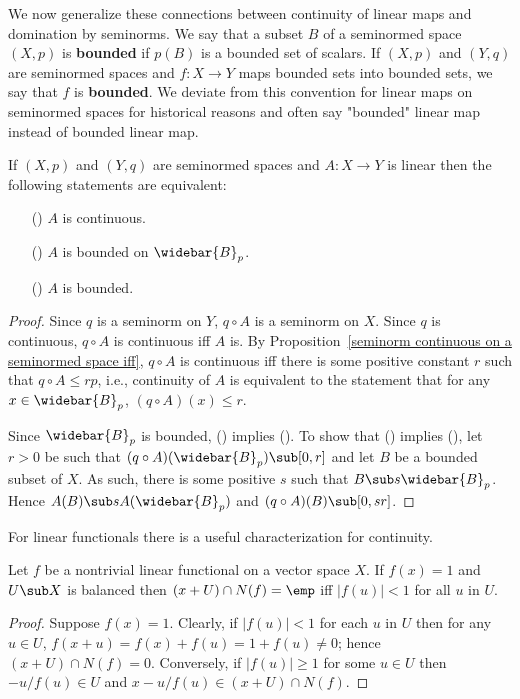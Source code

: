 We now generalize these connections between continuity of linear maps and domination by seminorms. We say that a subset $B$ of a seminormed space $(X,p)$ is \textbf{bounded} if $p(B)$ is a bounded set of scalars. If $(X,p)$ and $(Y,q)$ are seminormed spaces and $f:X\to Y$ maps bounded sets into bounded sets, we say that $f$ is \textbf{bounded}. We deviate from this convention for linear maps on seminormed spaces for historical reasons and often say "bounded" linear map instead of bounded linear map.
\begin{theorem}\label{seminormed space continuous iff}
If $(X,p)$ and $(Y,q)$ are seminormed spaces and $A:X\to Y$ is linear then the following statements are equivalent:
\begin{itemize}
\item[(\rmnum{1})] $A$ is continuous.
\item[(\rmnum{2})] $A$ is bounded on $\widebar{B}_p$.
\item[(\rmnum{3})] $A$ is bounded.
\end{itemize}
\end{theorem}
\begin{proof}
Since $q$ is a seminorm on $Y$, $q\circ A$ is a seminorm on $X$. Since $q$ is continuous, $q\circ A$ is continuous iff $A$ is. By Proposition~\ref{seminorm continuous on a seminormed space iff}, $q\circ A$ is continuous iff there is some positive constant $r$ such that $q\circ A\leq rp$, i.e., continuity of $A$ is equivalent to the statement that for any $x\in\widebar{B}_p$, $(q\circ A)(x)\leq r$.\par
Since $\widebar{B}_p$ is bounded, () implies (). To show that () implies (), let $r>0$ be such that $(q\circ A)(\widebar{B}_p)\sub[0,r]$ and let $B$ be a bounded subset of $X$. As such, there is some positive $s$ such that $B\sub s\widebar{B}_p$. Hence $A(B)\sub sA(\widebar{B}_p)$ and $(q\circ A)(B)\sub[0,sr]$.
\end{proof}
For linear functionals there is a useful characterization for continuity.
\begin{lemma}\label{TVS linear functional balanced nbhd lemma}
Let $f$ be a nontrivial linear functional on a vector space $X$. If $f(x)=1$ and $U\sub X$ is balanced then $(x+U)\cap N(f)=\emp$ iff $|f(u)|<1$ for all $u$ in $U$.
\end{lemma}
\begin{proof}
Suppose $f(x)=1$. Clearly, if $|f(u)|<1$ for each $u$ in $U$ then for any $u\in U$, $f(x+u)=f(x)+f(u)=1+f(u)\neq 0$; hence $(x+U)\cap N(f)=0$. Conversely, if $|f(u)|\geq 1$ for some $u\in U$ then $-u/f(u)\in U$ and $x-u/f(u)\in(x+U)\cap N(f)$.
\end{proof}
